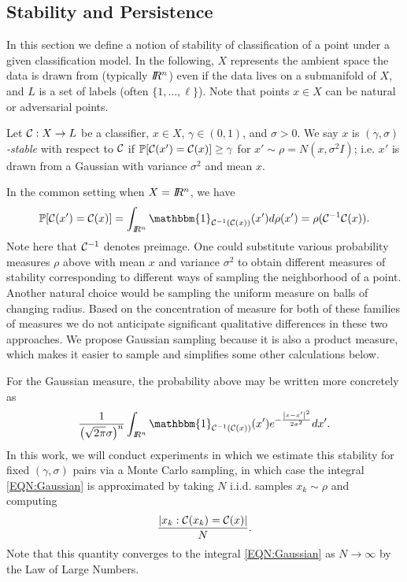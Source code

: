 \subsection{Stability and Persistence} \label{subsec:stab}
In this section we define a notion of stability of classification of a point under a given classification model. In the following, $X$ represents the ambient space the data is drawn from (typically $I\!\!R^n$) even if the data lives on a submanifold of $X$, and $L$ is a set of labels (often $\{1,\dots,\ell\}$).  Note that points $x\in X$ can be natural or adversarial points.%

\begin{definition}
Let $\mathcal{C}:X\to L$ be a classifier, $x \in X$, $\gamma\in(0,1)$, and $\sigma>0$. We say $x$ is \emph{$(\gamma,\sigma)$-stable} with respect to $\mathcal{C}$ if $\mathbb{P}[\mathcal{C}(x')=\mathcal{C}(x)] \geq \gamma$ for $x' \sim \rho = N(x, \sigma^2 I)$; i.e. $x'$ is drawn from a Gaussian with variance $\sigma^2$ and mean $x$.
\end{definition}

In the common setting when $X=I\!\!R^n$, we have
\[\mathbb{P}[\CC(x')=\CC(x)] = \int_{\RR^n} \mathbbm{1}_{\CC^{-1}(\CC(x))} (x') d\rho (x') = \rho(\CC^{-1}\CC(x)).\]
Note here that $\mathcal{C}^{-1}$ denotes preimage. %
One could substitute various probability measures $\rho$ above with mean $x$ and variance $\sigma^2$ to obtain different measures of stability corresponding to different ways of sampling the neighborhood of a point.  Another natural choice would be sampling the uniform measure on balls of changing radius. Based on the concentration of measure for both of these families of measures we do not anticipate significant qualitative differences in these two approaches. We propose Gaussian sampling because it is also a product measure, which makes it easier to sample and simplifies some other calculations below.

For the Gaussian measure, the probability above may be written more concretely as
\begin{equation}\label{EQN:Gaussian}
\frac{1}{\left(\sqrt{2\pi}\sigma\right)^{n}} \int_{\RR^n} \mathbbm{1}_{\CC^{-1}(\CC(x))} (x')e^{-\frac{\norm{x - x'}^2}{2\sigma^2}} dx'.
\end{equation}
In this work, we will conduct experiments in which we estimate this stability for fixed $(\gamma,\sigma)$ pairs via a Monte Carlo sampling, in which case the integral \eqref{EQN:Gaussian} is approximated by taking $N$ i.i.d. samples $x_k \sim \rho$ and computing
\[
    \frac{\left\vert x_k : \mathcal{C}(x_k) = \mathcal{C}(x) \right\vert}{N}.
\]
Note that this quantity converges to the integral \eqref{EQN:Gaussian} as $N\to\infty$ by the Law of Large Numbers.

